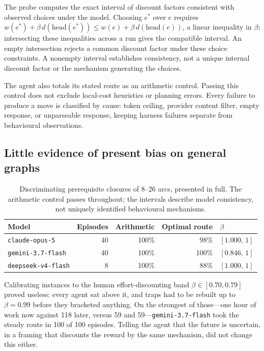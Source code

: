 \documentclass{article}
\begin{document}
The probe computes the exact interval of discount factors consistent with observed
choices under the model. Choosing $e^\ast$ over $e$ requires
$w(e^\ast) + \beta\, d(\mathrm{head}(e^\ast)) \leq w(e) + \beta\, d(\mathrm{head}(e))$,
a linear inequality in $\beta$; intersecting these inequalities across a run gives
the compatible interval. An empty intersection rejects a common discount factor
under these choice constraints. A nonempty interval establishes consistency, not a
unique internal discount factor or the mechanism generating the choices.

The agent also totals its stated route as an arithmetic control. Passing this
control does not exclude local-cost heuristics or planning errors. Every failure to
produce a move is classified by cause: token ceiling, provider content filter,
empty response, or unparseable response, keeping harness failures separate from
behavioural observations.

\subsection{Little evidence of present bias on general graphs}

\begin{table}[ht]
\caption{Discriminating prerequisite closures of 8--26 arcs, presented in full. The
arithmetic control passes throughout; the intervals describe model consistency,
not uniquely identified behavioural mechanisms.}
\label{tab:agents}
\centering
\begin{tabular}{lrrrl}
\toprule
Model & Episodes & Arithmetic & Optimal route & $\beta$ \\
\midrule
\texttt{claude-opus-5}      & 40 & 100\% &  98\% & $[1.000,\,1]$ \\
\texttt{gemini-3.7-flash}   & 40 & 100\% & 100\% & $[0.846,\,1]$ \\
\texttt{deepseek-v4-flash}  &  8 & 100\% &  88\% & $[1.000,\,1]$ \\
\bottomrule
\end{tabular}
\end{table}

Calibrating instances to the human effort-discounting band $\beta \in [0.70,
0.79]$~\cite{augenblick,cheung} proved useless: every agent sat above it, and traps
had to be rebuilt up to $\beta = 0.99$ before they bracketed anything. On the
strongest of those---one hour of work now against 118 later, versus 59 and
59---\texttt{gemini-3.7-flash} took the steady route in 100 of 100 episodes. Telling
the agent that the future is uncertain, in a framing that discounts the reward by the
same mechanism, did not change this either.
\end{document}
